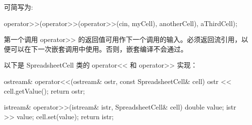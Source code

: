 可简写为:

\begin{cpp}
operator>>(operator>>(operator>>(cin, myCell), anotherCell), aThirdCell);
\end{cpp}

第一个调用 operator>{}> 的返回值可用作下一个调用的输入。必须返回流引用，以便可以在下一次嵌套调用中使用。否则，嵌套编译不会通过。

以下是 SpreadsheetCell 类的 operator<{}< 和 operator>{}> 实现：

\begin{cpp}
ostream& operator<<(ostream& ostr, const SpreadsheetCell& cell)
{
    ostr << cell.getValue();
    return ostr;
}

istream& operator>>(istream& istr, SpreadsheetCell& cell)
{
    double value;
    istr >> value;
    cell.set(value);
    return istr;
}
\end{cpp}










